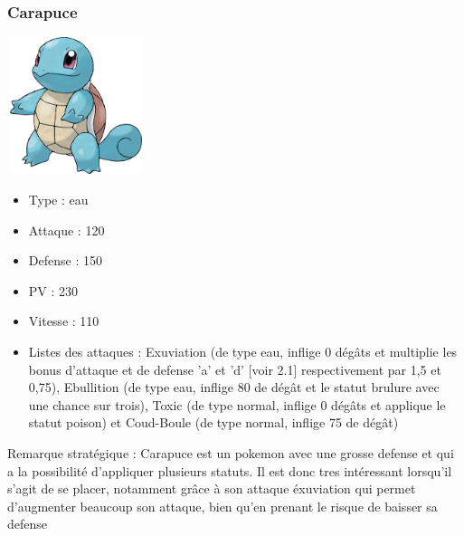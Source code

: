 		\subsubsection{Carapuce}
            \begin{center}
				\includegraphics[width=4cm,height=4cm]{images/carapuce}
			\end{center}
			\begin{itemize}
				\item Type : eau
				\item Attaque : 120
				\item Defense : 150
				\item PV : 230
				\item Vitesse : 110
				\item Listes des attaques : Exuviation (de type eau, inflige 0 dégâts et multiplie les bonus d'attaque et de defense 'a' et 'd' [voir 2.1] respectivement par 1,5 et 0,75), Ebullition (de type eau, inflige 80 de dégât et le statut brulure avec une chance sur trois), Toxic (de type normal, inflige 0 dégâts et applique le statut poison) et Coud-Boule (de type normal, inflige 75 de dégât)
			\end{itemize}
			Remarque stratégique : Carapuce est un pokemon avec une grosse defense et qui a la possibilité d'appliquer plusieurs statuts. Il est donc tres intéressant lorsqu'il s'agit de se placer, notamment grâce à son attaque éxuviation qui permet d'augmenter beaucoup son attaque, bien qu'en prenant le risque de baisser sa defense
